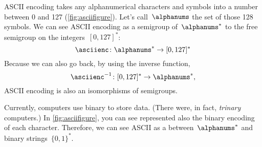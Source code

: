 \begin{example}
    ASCII encoding takes any alphanumerical characters and symbols into a number between 0 and 127 (\cref{fig:asciifigure}).
    Let's call~$\alphanums$ the set of those 128 symbols.
    We can see ASCII encoding as a semigroup \whomo of~$\alphanums^*$ to the free semigroup on the integers~$[0,127]^*$:
    \begin{equation*}
        \label{eq:ASCII-semi}
        \asciienc\colon \alphanums^* \to  [0,127]^*
    \end{equation*}
    Because we can also go back, by using the inverse function,
    \begin{equation*}
        \label{eq:ASCII-semi-inv}
        \asciienc^{-1}\colon  [0,127]^*  \to  \alphanums^*,
    \end{equation*}
    ASCII encoding is also an isomorphisms of semigroups.
\end{example}

\begin{example}
    Currently, computers use binary to store data. (There were, in fact, \emph{trinary} computers.)
    In \cref{fig:asciifigure}, you can see represented also the binary encoding of each character.
    Therefore, we can see ASCII as a \whomo between~$\alphanums^*$ and binary strings~$\{0,1\}^*$.
\end{example}

